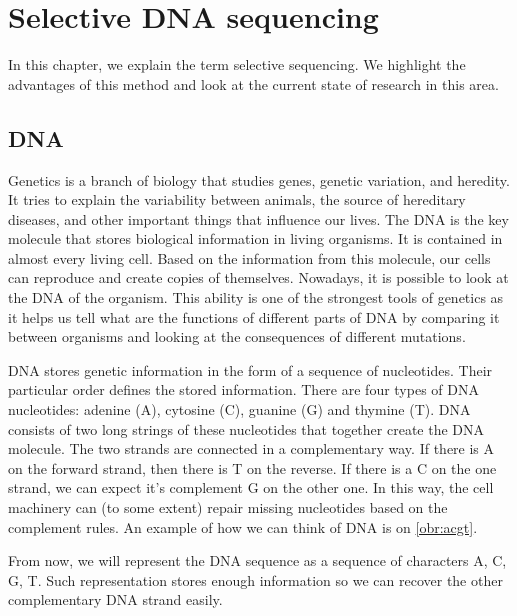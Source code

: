 \chapter{Selective DNA sequencing}
\label{kap:selSeq}

In this chapter, we explain the term selective sequencing. We highlight the
advantages of this method and look at the current state of research in this area.

\section{DNA}

Genetics is a branch of biology that studies genes, genetic variation, and heredity.
It tries to explain the variability between animals, the source of hereditary diseases, and
other important things that influence our lives. The DNA is the key molecule
that stores biological information in living organisms. It is contained in
almost every living cell. Based on the information from this molecule, our cells can reproduce and create copies of
themselves. Nowadays, it is possible to look at the DNA of the organism. This ability is
one of the strongest tools of genetics as it helps us tell what are the functions
of different parts of DNA by comparing it between organisms and looking at the
consequences of different mutations.

DNA stores genetic information in the form of a sequence of nucleotides. Their particular order defines the stored
information. There are four types of DNA nucleotides:
adenine (A), cytosine (C), guanine (G) and thymine (T). DNA consists of two long
strings of these nucleotides that together create the DNA molecule. The two strands
are connected in a complementary way. If there is A on the forward strand,
then there is T on the reverse. If there is a C on the one strand, we can expect
it's complement G on the other one. In this way, the cell machinery can (to some extent) repair
missing nucleotides based on the complement rules. An example of how we can think
of DNA is on \ref{obr:acgt}.

From now, we will represent the DNA sequence as a sequence of characters A, C, G, T.
Such representation stores enough information so we can recover the other complementary
DNA strand easily.


